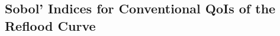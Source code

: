 \subsection{Sobol' Indices for Conventional QoIs of the Reflood Curve}\label{sub:sa_application_conventional_sobol}
